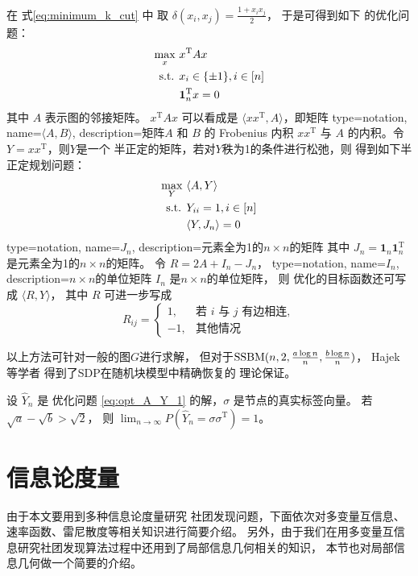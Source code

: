 在 式\eqref{eq:minimum_k_cut} 中
取 $\delta(x_i, x_j) = \frac{1+x_ix_j}{2}$，
于是可得到如下
的优化问题：
\begin{align}
  \max_x\  &  x^{\mathrm{T}} A x \notag \\
  \textrm{s.t. } & x_{i} \in \{\pm 1\}, i \in [n] \notag \\
  & \mathbf{1}_n^{\mathrm{T}} x = 0
\end{align}
其中 $A$ 表示图的邻接矩阵。
$ x^{\mathrm{T}} A x $ 可以看成是 $\langle xx^{\mathrm{T}}, A \rangle $，即矩阵
{
  type=notation,
  name={$\langle A, B \rangle $},
  description={矩阵$A$ 和 $B$ 的 Frobenius 内积}
}
$xx^{\mathrm{T}}$ 与 $A$ 的内积。令$Y=xx^{\mathrm{T}}$，则$Y$是一个
半正定的矩阵，若对$Y$秩为1的条件进行松弛，则
得到如下半正定规划问题：
\begin{align}\label{eq:opt_A_Y_1}
  \max_Y\  & \langle A, Y \rangle  \notag \\
  \textrm{s.t. } & Y_{ii} = 1, i \in [n] \notag \\
  & \langle Y, J_n \rangle  = 0
\end{align}
{
  type=notation,
  name={$J_n$},
  description={元素全为1的$n\times n$的矩阵}
}
其中 $J_n=\mathbf{1}_n\mathbf{1}_n^{\mathrm{T}}$
是元素全为1的$n\times n$的矩阵。
令 $R=2A + I_n - J_n$，
{
  type=notation,
  name={$I_n$},
  description={$n\times n$的单位矩阵}
}
$I_n$ 是$n\times n$的单位矩阵，
则
优化的目标函数还可写成 $ \langle R, Y \rangle $，
其中 $R$ 可进一步写成
\begin{equation}\label{eq:def_B_sdp}
    R_{ij} = \begin{cases}
        1, & \text{若 $i$ 与 $j$ 有边相连}, \\
        -1,& \text{其他情况}
    \end{cases}
\end{equation}  

以上方法可针对一般的图$G$进行求解，
但对于$\operatorname{SSBM}(n,2, \frac{a \log n}{n}, \frac{b \log n}{n})$，
Hajek 等学者 \cite{hajek2016achieving} 得到了SDP在随机块模型中精确恢复的
理论保证。
\begin{theorem}
  设 $\hat{Y}_n$ 是
  优化问题 \eqref{eq:opt_A_Y_1} 的解，$\sigma$ 是节点的真实标签向量。
  若 $\sqrt{a} - \sqrt{b}
  > \sqrt{2}$，
  则
  $\lim_{n\to\infty} P(\hat{Y}_n=\sigma\sigma^{\mathrm{T}})=1$。
\end{theorem}
\section{信息论度量}
由于本文要用到多种信息论度量研究
社团发现问题，下面依次对多变量互信息、速率函数、雷尼散度等相关知识进行简要介绍。
另外，由于我们在用多变量互信息研究社团发现算法过程中还用到了局部信息几何相关的知识，
本节也对局部信息几何做一个简要的介绍。
